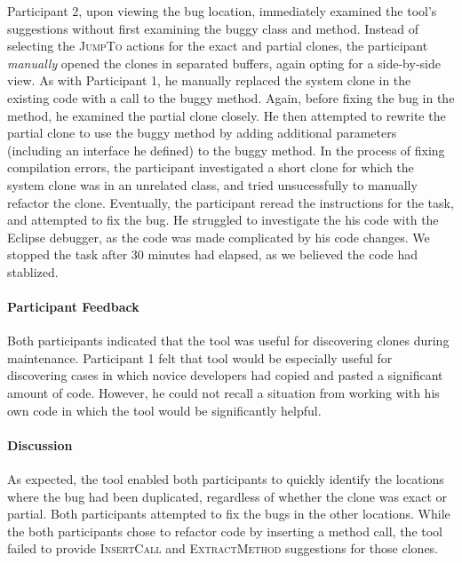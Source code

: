 \documentclass[nocopyrightspace,10pt]{sigplanconf}
\newcommand{\todo}[1]{{\bfseries [[#1]]}}
\renewcommand{\todo}[1]{\relax}
\begin{document}
Participant 2, upon viewing the bug location, immediately examined the
tool's suggestions without first examining the buggy class and method.
Instead of selecting the \textsc{JumpTo} actions for the exact and
partial clones, the participant \textit{manually} opened the clones in separated
buffers, again opting for a side-by-side view. As with Participant 1,
he manually replaced the system clone in the existing code with a call
to the buggy method. Again, before fixing the bug in the method, he
examined the partial clone closely. He then attempted to rewrite the partial
clone to use the buggy method by adding additional parameters
(including an interface he defined) to the buggy method. In the
process of fixing compilation errors, the participant investigated a
short clone for which the system clone was in an unrelated
class, and tried unsucessfully to manually refactor the clone. 
Eventually, the participant reread the instructions for the
task, and attempted to fix the bug. He struggled to investigate the
his code with the Eclipse debugger, as the code was made complicated
by his code changes. We stopped the task after 30 minutes had elapsed,
as we believed the code had stablized.

\paragraph{Participant Feedback}
Both participants indicated that the tool was useful for discovering
clones during maintenance. Participant 1 felt that tool would be
especially useful for discovering cases in which novice developers had
copied and pasted a significant amount of code. However, he could not recall a
situation from working with his own code in which the tool would be
significantly helpful.

\paragraph{Discussion}
As expected, the tool enabled both participants to quickly identify
the locations where the bug had been duplicated, regardless of whether
the clone was exact or partial. Both participants
attempted to fix the bugs in the other locations. 
While the both participants chose to refactor code by
inserting a method call, the tool failed to provide
\textsc{InsertCall} and \textsc{ExtractMethod} suggestions for those
clones. \todo{Why did this happen?}
\end{document}
